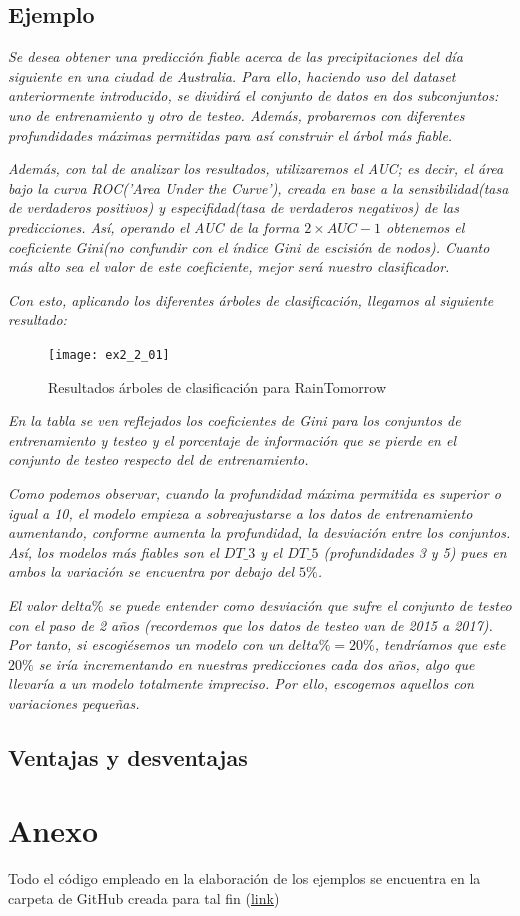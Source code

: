 \documentclass[12pt,twoside]{article}
\begin{document}
\subsection{Ejemplo}
\textit{Se desea obtener una predicción fiable acerca de las precipitaciones del día siguiente en una ciudad de Australia. Para ello, haciendo uso del dataset anteriormente introducido, se dividirá el conjunto de datos en dos subconjuntos: uno de entrenamiento y otro de testeo. Además, probaremos con diferentes profundidades máximas permitidas para así construir el árbol más fiable.}

\textit{Además, con tal de analizar los resultados, utilizaremos el AUC; es decir, el área bajo la curva ROC('Area Under the Curve'), creada en base a la sensibilidad(tasa de  verdaderos positivos) y especifidad(tasa de verdaderos negativos) de las predicciones. Así, operando el AUC de la forma $2 \times AUC - 1$ obtenemos el coeficiente Gini(no confundir con el índice Gini de escisión de nodos). Cuanto más alto sea el valor de este coeficiente, mejor será nuestro clasificador.}

\textit{Con esto, aplicando los diferentes árboles de clasificación, llegamos al siguiente resultado:}

\begin{figure}[h]
\centering
\texttt{[image: ex2\_2\_01]}
\caption{Resultados árboles de clasificación para RainTomorrow}
\end{figure}

\textit{En la tabla se ven reflejados los coeficientes de Gini para los conjuntos de entrenamiento y testeo y el porcentaje de información que se pierde en el conjunto de testeo respecto del de entrenamiento.}

\textit{Como podemos observar, cuando la profundidad máxima permitida es superior o igual a 10, el modelo empieza a sobreajustarse a los datos de entrenamiento aumentando, conforme aumenta la profundidad, la desviación entre los conjuntos. Así, los modelos más fiables son el $DT\_3$ y el $DT\_5$ (profundidades 3 y 5) pues en ambos la variación se encuentra por debajo del $5\%$.}

\textit{El valor $delta\%$ se puede entender como desviación que sufre el conjunto de testeo con el paso de 2 años (recordemos que los datos de testeo van de 2015 a 2017). Por tanto, si escogiésemos un modelo con un $delta\% = 20\%$, tendríamos que este $20\%$ se iría incrementando en nuestras predicciones cada dos años, algo que llevaría a un modelo totalmente impreciso. Por ello, escogemos aquellos con variaciones pequeñas.}



\subsection{Ventajas y desventajas}





\section{Anexo} \label{sec:Anexo}
Todo el código empleado en la elaboración de los ejemplos se encuentra en la carpeta de GitHub creada para tal fin (\url{link})
\end{document}
